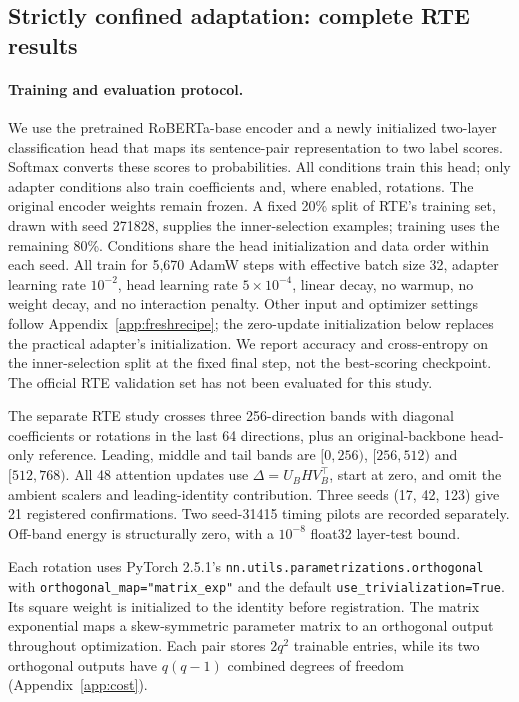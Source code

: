 \documentclass{article}
\begin{document}
\subsection{Strictly confined adaptation: complete RTE results}
\label{app:bandstudy}

\paragraph{Training and evaluation protocol.} We use the pretrained RoBERTa-base encoder and a newly initialized two-layer classification head that maps its sentence-pair representation to two label scores. Softmax converts these scores to probabilities. All conditions train this head; only adapter conditions also train coefficients and, where enabled, rotations. The original encoder weights remain frozen. A fixed 20\% split of RTE's training set, drawn with seed 271828, supplies the inner-selection examples; training uses the remaining 80\%. Conditions share the head initialization and data order within each seed. All train for 5{,}670 AdamW steps with effective batch size 32, adapter learning rate $10^{-2}$, head learning rate $5\times10^{-4}$, linear decay, no warmup, no weight decay, and no interaction penalty. Other input and optimizer settings follow Appendix~\ref{app:freshrecipe}; the zero-update initialization below replaces the practical adapter's initialization. We report accuracy and cross-entropy on the inner-selection split at the fixed final step, not the best-scoring checkpoint. The official RTE validation set has not been evaluated for this study.

The separate RTE study crosses three 256-direction bands with diagonal coefficients or rotations in the last 64 directions, plus an original-backbone head-only reference. Leading, middle and tail bands are $[0,256)$, $[256,512)$ and $[512,768)$. All 48 attention updates use $\Delta=U_BHV_B^\top$, start at zero, and omit the ambient scalers and leading-identity contribution. Three seeds (17, 42, 123) give 21 registered confirmations. Two seed-31415 timing pilots are recorded separately. Off-band energy is structurally zero, with a $10^{-8}$ float32 layer-test bound.

Each rotation uses PyTorch 2.5.1's \texttt{nn.utils.parametrizations.orthogonal} with \texttt{orthogonal\_map="matrix\_exp"} and the default \texttt{use\_trivialization=True}. Its square weight is initialized to the identity before registration. The matrix exponential maps a skew-symmetric parameter matrix to an orthogonal output throughout optimization. Each pair stores $2q^2$ trainable entries, while its two orthogonal outputs have $q(q-1)$ combined degrees of freedom (Appendix~\ref{app:cost}).
\end{document}
